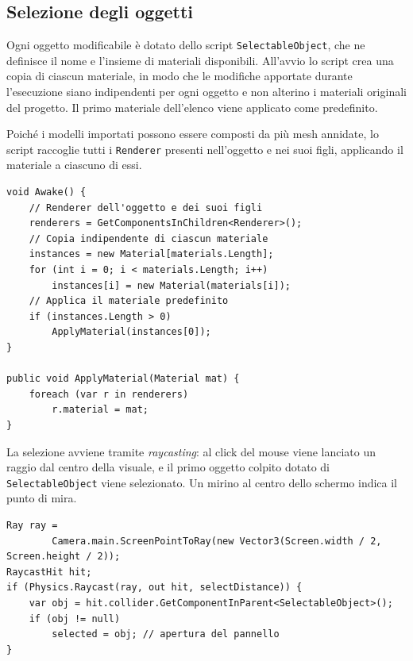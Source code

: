 \documentclass[12pt,a4paper,twoside]{book}
\begin{document}
\begin{minipage}{\textwidth}

\subsection{Selezione degli oggetti}
\label{subsec:selezione}

Ogni oggetto modificabile è dotato dello script \texttt{SelectableObject}, che ne definisce il nome e l'insieme di materiali disponibili. All'avvio lo script crea una copia di ciascun materiale, in modo che le modifiche apportate durante l'esecuzione siano indipendenti per ogni oggetto e non alterino i materiali originali del progetto. Il primo materiale dell'elenco viene applicato come predefinito.

Poiché i modelli importati possono essere composti da più mesh annidate, lo script raccoglie tutti i \texttt{Renderer} presenti nell'oggetto e nei suoi figli, applicando il materiale a ciascuno di essi.

\begin{lstlisting}[style=hlsl,
    caption={Creazione delle istanze dei materiali e applicazione.},
    label={lst:selectable}]
void Awake() {
    // Renderer dell'oggetto e dei suoi figli
    renderers = GetComponentsInChildren<Renderer>();
    // Copia indipendente di ciascun materiale
    instances = new Material[materials.Length];
    for (int i = 0; i < materials.Length; i++)
        instances[i] = new Material(materials[i]);
    // Applica il materiale predefinito
    if (instances.Length > 0)
        ApplyMaterial(instances[0]);
}

public void ApplyMaterial(Material mat) {
    foreach (var r in renderers)
        r.material = mat;
}
\end{lstlisting}

La selezione avviene tramite \textit{raycasting}: al click del mouse viene lanciato un raggio dal centro della visuale, e il primo oggetto colpito dotato di \texttt{SelectableObject} viene selezionato. Un mirino al centro dello schermo indica il punto di mira.

\begin{lstlisting}[style=hlsl,
    caption={Selezione di un oggetto tramite raycast.},
    label={lst:raycast}]
Ray ray =
        Camera.main.ScreenPointToRay(new Vector3(Screen.width / 2, Screen.height / 2));
RaycastHit hit;
if (Physics.Raycast(ray, out hit, selectDistance)) {
    var obj = hit.collider.GetComponentInParent<SelectableObject>();
    if (obj != null)
        selected = obj; // apertura del pannello
}
\end{lstlisting}
\end{minipage}
\end{document}
